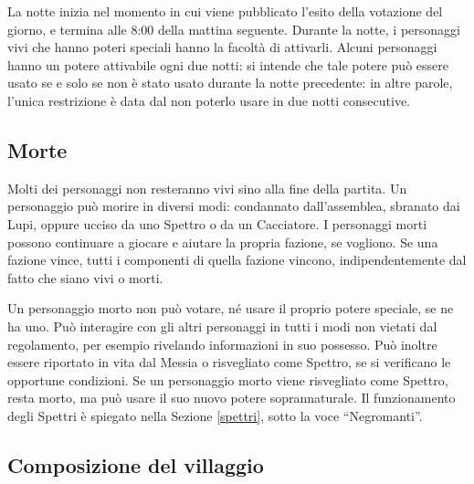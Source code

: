 \documentclass[a4paper,10pt]{article}
\begin{document}
La notte inizia nel momento in cui viene pubblicato l'esito della votazione del giorno, e termina alle 8:00 della mattina seguente.
Durante la notte, i personaggi vivi che hanno poteri speciali hanno la facoltà di attivarli.
Alcuni personaggi hanno un potere attivabile ogni due notti: si intende che tale potere può essere usato se e solo se non è stato usato durante la notte precedente: in altre parole, l'unica restrizione è data dal non poterlo usare in due notti consecutive.

\subsection{Morte}

Molti dei personaggi non resteranno vivi sino alla fine della partita. Un personaggio può morire in diversi modi: condannato dall'assemblea, sbranato dai Lupi, oppure ucciso da uno Spettro o da un Cacciatore.
I personaggi morti possono continuare a giocare e aiutare la propria fazione, se vogliono. Se una fazione vince, tutti i componenti di quella fazione vincono, indipendentemente dal fatto che siano vivi o morti.

Un personaggio morto non può votare, né usare il proprio potere speciale, se ne ha uno. Può interagire con gli altri personaggi in tutti i modi non vietati dal regolamento, per esempio rivelando informazioni in suo possesso. Può inoltre essere riportato in vita dal Messia o risvegliato come Spettro, se si verificano le opportune condizioni.
Se un personaggio morto viene risvegliato come Spettro, resta morto, ma può usare il suo nuovo potere soprannaturale. Il funzionamento degli Spettri è spiegato nella Sezione \ref{spettri}, sotto la voce ``Negromanti''.

% 


\subsection{Composizione del villaggio}
\end{document}
